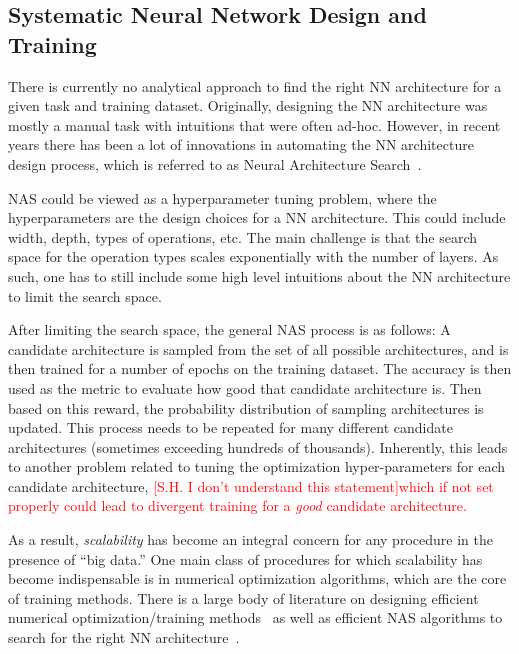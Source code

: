 \subsection{Systematic Neural Network Design and Training}
\label{sec:train}

There is currently no analytical approach to find the right NN architecture for
a given task and training dataset.
Originally, designing the NN architecture was mostly a manual task with
intuitions that were often ad-hoc. However, in recent years there has been
a lot of innovations in automating the NN architecture design process, which is 
referred to as Neural Architecture Search~\cite{zoph2016neural,pham2018efficient,tan2019mnasnet,liu2018darts,wu2019fbnet,cai2018proxylessnas,cai2019once}.

NAS could be viewed as a hyperparameter tuning problem, where the hyperparameters are
the design choices for a NN architecture. This could include
width, depth, types of operations, etc. The main challenge
is that the search space for the operation types scales exponentially with the number
of layers.
As such, one has to still include some high level intuitions about the NN architecture
to limit the search space. 

After limiting the search space, the general NAS process is as follows:
A candidate architecture is sampled from the set of all
possible architectures, and is then trained for a number of epochs on the training dataset.
The accuracy is then used 
as the metric to evaluate how good that candidate architecture is. Then based
on this reward, the probability distribution of sampling architectures is updated.
This process needs to be repeated for many different candidate architectures (sometimes exceeding
hundreds of thousands). 
Inherently, this leads to another problem related to tuning the optimization hyper-parameters
for each candidate architecture, \textcolor{red}{[S.H. I don't understand this statement]which if not set properly could lead to divergent
training for a \emph{good} candidate architecture.}


As a result, \emph{scalability} has become an integral concern for any procedure in the presence of ``big data.'' 
One main class of procedures for which scalability has become indispensable is in
numerical optimization algorithms, which are the core of training methods. 
There is a large body of literature on designing
efficient  numerical optimization/training methods~\cite{reddi2018adaptive,shazeer2018adafactor,zhang2019lookahead,park2020lookahead,zhuang2020adabelief,liu2020variance,ginsburg2020stochastic,yao2020adahessian,ma2020apollo,gupta2018shampoo} as well as efficient NAS algorithms to 
search for the right NN architecture~\cite{zoph2016neural,pham2018efficient,tan2019mnasnet,liu2018darts,wu2019fbnet}.

